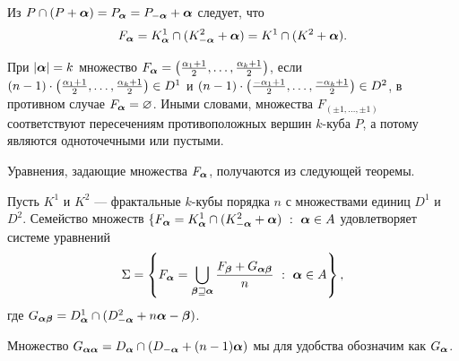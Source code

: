 Из $P\cap (P+{\bm{\alpha}})=P_{\bm{\alpha}}=P_{-{\bm{\alpha}}}+{\bm{\alpha}}$ следует, что $$F_{{\bm{\alpha}}}=K^1_{\bm{\alpha}}\cap(K^2_{-{\bm{\alpha}}}+{\bm{\alpha}})=K^1\cap(K^2+{\bm{\alpha}}).$$

При $|{\bm{\alpha}}|=k$ множество $F_{{\bm{\alpha}}}=\left(\frac{\alpha_1+1}{2},\ldots,\frac{\alpha_k+1}{2}\right)$, если $(n-1)\cdot\left(\frac{\alpha_1+1}{2},\ldots,\frac{\alpha_k+1}{2}\right)\in D^1$ и $(n-1)\cdot\left(\frac{-\alpha_1+1}{2},\ldots,\frac{-\alpha_k+1}{2}\right)\in D^2$, в противном случае $F_{{\bm{\alpha}}}=\varnothing$. 
Иными словами, множества $F_{(\pm1,\ldots,\pm1)}$ соответствуют пересечениям противоположных вершин $k$-куба $P$, а потому являются одноточечными или пустыми.

Уравнения, задающие множества $F_{\bm{\alpha}}$, получаются из следующей теоремы.

\begin{theorem}\label{IFC}
Пусть $K^1$ и $K^2$ --- фрактальные $k$-кубы порядка $n$ с множествами единиц $D^1$ и $D^2$.
Семейство множеств $\{F_\bma=K^1_{\bma}\cap(K^2_{-\bma}+\bma)\ :\ \bma\in A$ удовлетворяет системе уравнений
\begin{equation}\label{sideint}
\Sigma=\left\{
F_{\bm{\alpha}}=\bigcup\limits_{{\bm{\beta}}\sqsupseteq{\bm{\alpha}}} \dfrac{F_{\bm{\beta}}+G_{{\bm{\alpha}}{\bm{\beta}}}}{n}\ :\ {\bm{\alpha}}\in A\right\},
\end{equation}
где $G_{{\bm{\alpha}}{\bm{\beta}}}=D^1_{\bm{\alpha}}\cap(D^2_{-{\bm{\alpha}}}+n{\bm{\alpha}}-{\bm{\beta}})$.
\end{theorem}

Множество $G_{{\bm{\alpha}}{\bm{\alpha}}}=D_{\bm{\alpha}}\cap(D_{-{\bm{\alpha}}}+(n-1){\bm{\alpha}})$ мы для удобства обозначим как $G_{{\bm{\alpha}}}$.

